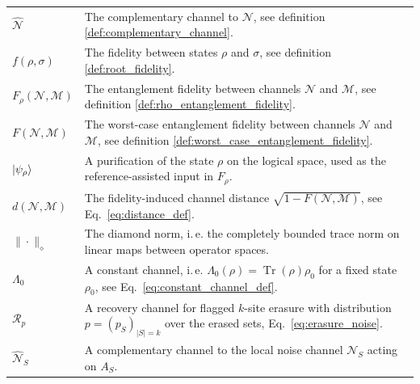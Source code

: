 \documentclass[11pt,letterpaper]{article}
\theoremstyle{plain}
\theoremstyle{plain}
\theoremstyle{plain}
\theoremstyle{plain}
\theoremstyle{plain}
\theoremstyle{plain}
\theoremstyle{plain}
\theoremstyle{definition}
\theoremstyle{plain}
\begin{document}
\begin{tabular}{@{}ll@{}}
\parbox[t]{0.22\textwidth}{$\widehat{\mathcal{N}}$} & \parbox[t]{0.72\textwidth}{The complementary channel to $\mathcal{N}$, see definition \ref{def:complementary_channel}.} \\[0.6em]

\parbox[t]{0.22\textwidth}{$f(\rho, \sigma)$} & \parbox[t]{0.72\textwidth}{The fidelity between states $\rho$ and $\sigma$, see definition \ref{def:root_fidelity}.} \\[0.6em]

\parbox[t]{0.22\textwidth}{$F_{\rho}(\mathcal{N}, \mathcal{M})$} & \parbox[t]{0.72\textwidth}{The entanglement fidelity between channels $\mathcal{N}$ and $\mathcal{M}$, see definition \ref{def:rho_entanglement_fidelity}.} \\[0.6em]

\parbox[t]{0.22\textwidth}{$F(\mathcal{N}, \mathcal{M})$} & \parbox[t]{0.72\textwidth}{The worst-case entanglement fidelity between channels $\mathcal{N}$ and $\mathcal{M}$, see definition \ref{def:worst_case_entanglement_fidelity}.} \\[0.6em]

\parbox[t]{0.22\textwidth}{$\ket{\psi_\rho}$} & \parbox[t]{0.72\textwidth}{A purification of the state $\rho$ on the logical space, used as the reference-assisted input in $F_\rho$.} \\[0.6em]

\parbox[t]{0.22\textwidth}{$d(\mathcal N,\mathcal M)$} & \parbox[t]{0.72\textwidth}{The fidelity-induced channel distance $\sqrt{1-F(\mathcal N,\mathcal M)}$, see Eq.~\eqref{eq:distance_def}.} \\[0.6em]

\parbox[t]{0.22\textwidth}{$\|\cdot\|_\diamond$} & \parbox[t]{0.72\textwidth}{The diamond norm, i.\,e. the completely bounded trace norm on linear maps between operator spaces.} \\[0.6em]

\parbox[t]{0.22\textwidth}{$\Lambda_0$} & \parbox[t]{0.72\textwidth}{A constant channel, i.\,e. $\Lambda_0(\rho)=\operatorname{Tr}(\rho)\rho_0$ for a fixed state $\rho_0$, see Eq.~\eqref{eq:constant_channel_def}.} \\[0.6em]

\parbox[t]{0.22\textwidth}{$\mathcal R_p$} & \parbox[t]{0.72\textwidth}{A recovery channel for flagged $k$-site erasure with distribution $p=(p_S)_{|S|=k}$ over the erased sets, Eq.~\eqref{eq:erasure_noise}.} \\[0.6em]

\parbox[t]{0.22\textwidth}{$\widehat{\mathcal N}_S$} & \parbox[t]{0.72\textwidth}{A complementary channel to the local noise channel $\mathcal N_S$ acting on $A_S$.} \\[0.6em]


\end{tabular}
\end{document}
